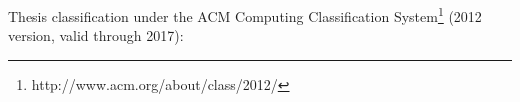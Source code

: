 \begin{acm}
    Thesis classification under the ACM Computing Classification System\footnote{http://www.acm.org/about/class/2012/} (2012 version, valid through 2017):
    
    
\end{acm}



